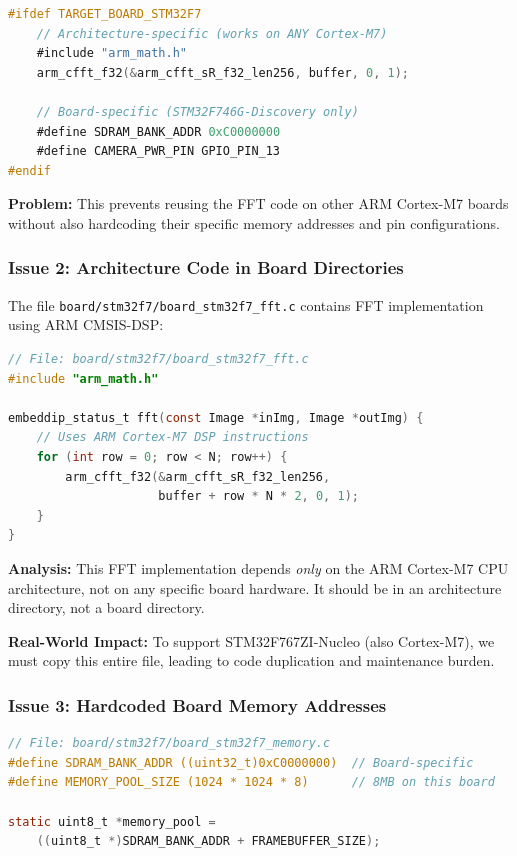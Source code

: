 \documentclass[11pt,a4paper]{article}
\begin{document}
\begin{lstlisting}[language=C,caption={Current conflated code structure}]
#ifdef TARGET_BOARD_STM32F7
    // Architecture-specific (works on ANY Cortex-M7)
    #include "arm_math.h"
    arm_cfft_f32(&arm_cfft_sR_f32_len256, buffer, 0, 1);

    // Board-specific (STM32F746G-Discovery only)
    #define SDRAM_BANK_ADDR 0xC0000000
    #define CAMERA_PWR_PIN GPIO_PIN_13
#endif
\end{lstlisting}

\textbf{Problem:} This prevents reusing the FFT code on other ARM Cortex-M7 boards without also hardcoding their specific memory addresses and pin configurations.

\subsubsection{Issue 2: Architecture Code in Board Directories}

The file \texttt{board/stm32f7/board\_stm32f7\_fft.c} contains FFT implementation using ARM CMSIS-DSP:

\begin{lstlisting}[language=C,caption={FFT code misplaced in board directory}]
// File: board/stm32f7/board_stm32f7_fft.c
#include "arm_math.h"

embeddip_status_t fft(const Image *inImg, Image *outImg) {
    // Uses ARM Cortex-M7 DSP instructions
    for (int row = 0; row < N; row++) {
        arm_cfft_f32(&arm_cfft_sR_f32_len256,
                     buffer + row * N * 2, 0, 1);
    }
}
\end{lstlisting}

\textbf{Analysis:} This FFT implementation depends \emph{only} on the ARM Cortex-M7 CPU architecture, not on any specific board hardware. It should be in an architecture directory, not a board directory.

\textbf{Real-World Impact:} To support STM32F767ZI-Nucleo (also Cortex-M7), we must copy this entire file, leading to code duplication and maintenance burden.

\subsubsection{Issue 3: Hardcoded Board Memory Addresses}

\begin{lstlisting}[language=C,caption={Hardcoded board-specific memory addresses}]
// File: board/stm32f7/board_stm32f7_memory.c
#define SDRAM_BANK_ADDR ((uint32_t)0xC0000000)  // Board-specific
#define MEMORY_POOL_SIZE (1024 * 1024 * 8)      // 8MB on this board

static uint8_t *memory_pool =
    ((uint8_t *)SDRAM_BANK_ADDR + FRAMEBUFFER_SIZE);
\end{lstlisting}
\end{document}
